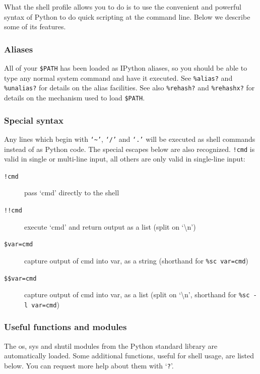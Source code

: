 What the shell profile allows you to do is to use the convenient and
powerful syntax of Python to do quick scripting at the command line.
Below we describe some of its features.


\subsubsection{Aliases}

All of your \texttt{\$PATH} has been loaded as IPython aliases, so
you should be able to type any normal system command and have it executed.
See \texttt{\%alias?} and \texttt{\%unalias?} for details on the alias
facilities. See also \texttt{\%rehash?} and \texttt{\%rehashx?} for
details on the mechanism used to load \texttt{\$PATH}.


\subsubsection{Special syntax}

Any lines which begin with \texttt{`\textasciitilde{}'}, \texttt{`/'}
and \texttt{`.'} will be executed as shell commands instead of as
Python code. The special escapes below are also recognized. \texttt{!cmd}
is valid in single or multi-line input, all others are only valid
in single-line input:

\begin{description}
\item [{\texttt{!cmd}}] pass `cmd' directly to the shell 
\item [{\texttt{!!cmd}}] execute `cmd' and return output as a list (split
on `\textbackslash{}n') 
\item [{\texttt{\$var=cmd}}] capture output of cmd into var, as a string
(shorthand for \texttt{\%sc var=cmd})
\item [{\texttt{\$\$var=cmd}}] capture output of cmd into var, as a list
(split on `\textbackslash{}n', shorthand for \texttt{\%sc -l var=cmd})
\end{description}

\subsubsection{Useful functions and modules}

The os, sys and shutil modules from the Python standard library are
automatically loaded. Some additional functions, useful for shell
usage, are listed below. You can request more help about them with
`\texttt{?}'.


